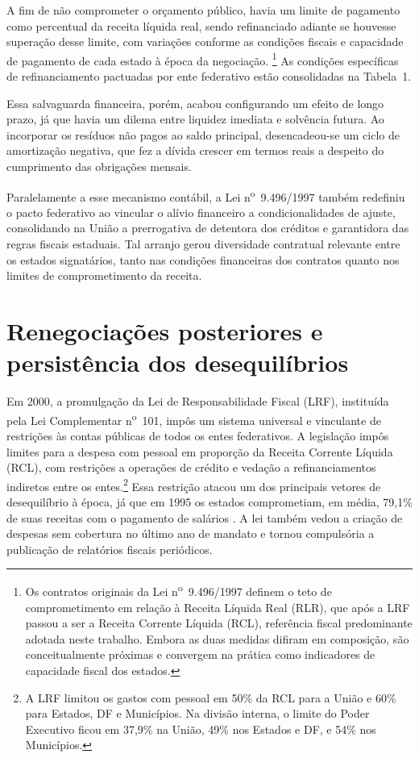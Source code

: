 A fim de não comprometer o orçamento público, havia um limite de pagamento como percentual da receita líquida real, sendo refinanciado adiante se houvesse superação desse limite, com variações conforme as condições fiscais e capacidade de pagamento de cada estado à época da negociação. \footnote{Os contratos originais da Lei n\textsuperscript{o}~9.496/1997 definem o teto de comprometimento em relação à Receita Líquida Real (RLR), que após a LRF passou a ser a Receita Corrente Líquida (RCL), referência fiscal predominante adotada neste trabalho. Embora as duas medidas difiram em composição, são conceitualmente próximas e convergem na prática como indicadores de capacidade fiscal dos estados.} As condições específicas de refinanciamento pactuadas por ente federativo estão consolidadas na Tabela~1.



Essa salvaguarda financeira, porém, acabou configurando um efeito de longo prazo, já que havia um dilema entre liquidez imediata e solvência futura. Ao incorporar os resíduos não pagos ao saldo principal, desencadeou-se um ciclo de amortização negativa, que fez a dívida crescer em termos reais a despeito do cumprimento das obrigações mensais.

Paralelamente a esse mecanismo contábil, a Lei n\textsuperscript{o}~9.496/1997 também redefiniu o pacto federativo ao vincular o alívio financeiro a condicionalidades de ajuste, consolidando na União a prerrogativa de detentora dos créditos e garantidora das regras fiscais estaduais. Tal arranjo gerou diversidade contratual relevante entre os estados signatários, tanto nas condições financeiras dos contratos quanto nos limites de comprometimento da receita.

\section{Renegociações posteriores e persistência dos desequilíbrios}
\label{sec:lrf}

Em 2000, a promulgação da Lei de Responsabilidade Fiscal (LRF), instituída pela Lei Complementar n\textsuperscript{o}~101, impôs um sistema universal e vinculante de restrições às contas públicas de todos os entes federativos. A legislação impôs limites para a despesa com pessoal em proporção da Receita Corrente Líquida (RCL), com restrições a operações de crédito e vedação a refinanciamentos indiretos entre os entes.\footnote{A LRF limitou os gastos com pessoal em 50\% da RCL para a União e 60\% para Estados, DF e Municípios. Na divisão interna, o limite do Poder Executivo ficou em 37,9\% na União, 49\% nos Estados e DF, e 54\% nos Municípios.} Essa restrição atacou um dos principais vetores de desequilíbrio à época, já que em 1995 os estados comprometiam, em média, 79,1\% de suas receitas com o pagamento de salários \cite{giubertiLEIRESPONSABILIDADEFISCAL}. A lei também vedou a criação de despesas sem cobertura no último ano de mandato e tornou compulsória a publicação de relatórios fiscais periódicos.

